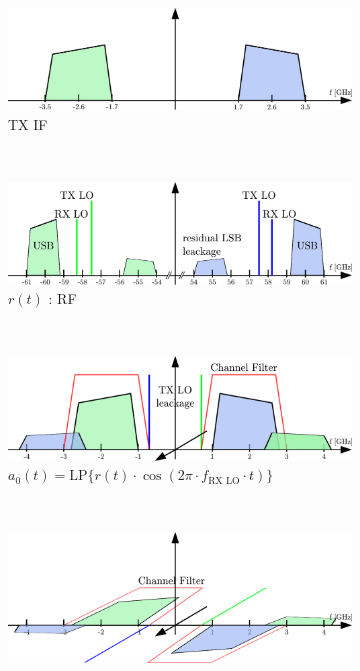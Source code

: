 \begin{figure}[p]
  \centering
  \begin{subfigure}{0.45\textwidth}
    \centering
    \includegraphics[width=\textwidth]{figures/rx_2_freq_tx_if}
    \caption{\gls{TX} \gls{IF}}
    \label{fig:rx_2_freq_tx_if}
  \end{subfigure}
  ~
  \begin{subfigure}{0.45\textwidth}
    \centering
    \includegraphics[width=\textwidth]{figures/rx_2_freq_rf}
    \caption{$r(t)$ : \gls{RF}}
    \label{fig:rx_2_freq_rf}
  \end{subfigure}
  \vspace{4ex} \\
  \begin{subfigure}{0.45\textwidth}
    \centering
    \includegraphics[width=\textwidth]{figures/rx_2_freq_a_0}
    \caption{$a_0(t) = \text{LP}\{r(t) \cdot \cos(2\pi \cdot f_{\text{RX LO}} \cdot t)\}$}
    \label{fig:rx_2_freq_a_0}
  \end{subfigure}
  ~
  \begin{subfigure}{0.45\textwidth}
    \centering
    \includegraphics[width=\textwidth]{figures/rx_2_freq_a_1}

\end{subfigure}
\end{figure}
